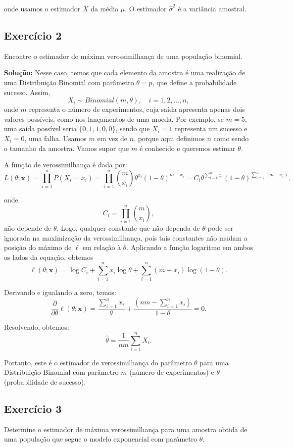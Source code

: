 \documentclass{article}
\begin{document}
onde usamos o estimador $\bar{X}$ da média $\mu$. O estimador $\hat{\sigma}^2$ é a variância amostral.

\subsection{Exercício 2}
Encontre o estimador de máxima verossimilhança de uma população binomial.

\vspace{0.5cm}
\textbf{Solução:} 
Nesse caso, temos que cada elemento da amostra é uma realização de uma Distribuição Binomial com parâmetro $\theta = p$, que define a probabilidade sucesso. Assim,
    $$X_i \sim Binomial(m, \theta), \quad i = 1, 2, \ldots, n,$$
onde $m$ representa o número de experimentos, cuja saída apresenta apenas dois valores possíveis, como nos lançamentos de uma moeda. Por exemplo, se $m = 5$, uma saída possível seria $\{0, 1, 1, 0, 0\}$, sendo que $X_i = 1$ representa um sucesso e $X_i = 0$, uma falha. Usamos $m$ em vez de $n$, porque aqui definimos $n$ como sendo o tamanho da amostra. Vamos supor que $m$ é conhecido e queremos estimar $\theta$.

A função de verossimilhança é dada por:
    $$L(\theta; \mathbf{x}) = \prod_{i=1}^n P(X_i = x_i) = \prod_{i=1}^n \binom{m}{x_i} \theta^{x_i} (1 - \theta)^{m - x_i} = C_i \theta^{\sum_{i=1}^n x_i}(1 - \theta)^{\sum_{i=1}^n (m - x_i)},$$

onde 
    $$C_i = \prod_{i=1}^n \binom{m}{x_i},$$
não depende de $\theta$. Logo, qualquer constante que não dependa de $\theta$ pode ser ignorada na maximização da verossimilhança, pois tais constantes não mudam a posição do máximo de $\ell$ em relação à $\theta$. Aplicando a função logaritmo em ambos os lados da equação, obtemos
    $$\ell(\theta; \mathbf{x}) = \log C_i + \sum_{i=1}^n x_i \log \theta + \sum_{i=1}^n (m - x_i) \log (1 - \theta).$$

Derivando e igualando a zero, temos:
    $$\frac{\partial}{\partial \theta} \ell(\theta; \mathbf{x}) = \frac{\sum_{i=1}^n x_i}{\theta} + \frac{(nm - \sum_{i=1}^n x_i)}{1 - \theta} = 0.$$

Resolvendo, obtemos:
    $$\hat{\theta} = \frac{1}{nm}\sum_{i=1}^n X_i.$$

Portanto, este é o estimador de verossimilhança do parâmetro $\theta$ para uma Distribuição Binomial com parâmetro $m$ (número de experimentos) e $\theta$ (probabilidade de sucesso).

\subsection{Exercício 3}
Determine o estimador de máxima verossimilhança para uma amostra obtida de uma população que segue o modelo exponencial com parâmetro $\theta$.
\end{document}
